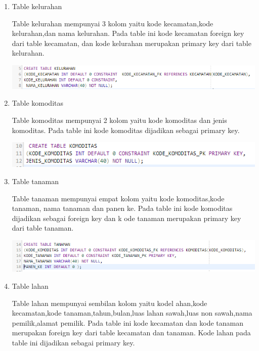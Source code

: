 \documentclass{article}
\begin{document}
\begin{enumerate}
\begin{enumerate}
\begin{center}
        \end{center}
        \item Table kelurahan
        \par Table kelurahan mempunyai 3 kolom yaitu kode kecamatan,kode kelurahan,dan nama kelurahan. Pada table ini kode kecamatan  foreign key dari table kecamatan, dan kode kelurahan merupakan primary key dari table kelurahan.
        \begin{center}
              \includegraphics[width=.8\textwidth]{figure/8.PNG}
        \end{center}
        \item Table komoditas
        \par Table komoditas mempunyai 2 kolom yaitu kode komoditas dan jenis komoditas. Pada table  ini kode komoditas dijadikan sebagai primary key.
        \begin{center}
              \includegraphics[width=.8\textwidth]{figure/9.PNG}
        \end{center}
        \item Table tanaman
        \par Table tanaman mempunyai empat kolom yaitu kode komoditas,kode tanaman, nama tanaman dan panen ke. Pada  table ini kode komoditas dijadikan sebagai  foreign key dan k ode tanaman merupakan primary key dari table tanaman.
        \begin{center}
              \includegraphics[width=.8\textwidth]{figure/10.PNG}
        \end{center}
        \newpage\item Table lahan
        \par Table lahan mempunyai sembilan kolom yaitu kodel ahan,kode kecamatan,kode tanaman,tahun,bulan,luas lahan sawah,luas non sawah,nama pemilik,alamat pemilik. Pada table ini kode kecamatan dan kode tanaman merupakan foreign key dari table kecamatan dan tanaman. Kode lahan pada table ini dijadikan sebagai primary key.
        \begin{center}

\end{center}
\end{enumerate}
\end{enumerate}
\end{document}
